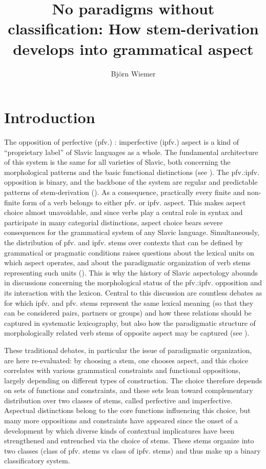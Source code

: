\documentclass[output=paper]{langscibook}
\author{Björn Wiemer\affiliation{Johannes Gutenberg Universität Mainz}}
\title[No paradigms without classification]{No paradigms without classification: How stem-derivation develops into grammatical aspect}
\begin{document}
\maketitle 

\section{Introduction}\label{wiemer:1}

The opposition of perfective (pfv.) : imperfective (ipfv.) aspect is a kind of “proprietary label” of Slavic languages as a whole. The fundamental architecture of this system is the same for all varieties of Slavic, both concerning the morphological patterns and the basic functional distinctions (see ). The pfv.:ipfv. opposition is binary, and the backbone of the system are regular and predictable patterns of stem-derivation (). As a consequence, practically every finite and non-finite form of a verb belongs to either pfv. or ipfv. aspect. This makes aspect choice almost unavoidable, and since verbs play a central role in syntax and participate in many categorial distinctions, aspect choice bears severe consequences for the grammatical system of any Slavic language. Simultaneously, the distribution of pfv. and ipfv. stems over contexts that can be defined by grammatical or pragmatic conditions raises questions about the lexical units on which aspect operates, and about the paradigmatic organization of verb stems representing such units (). This is why the history of Slavic aspectology abounds in discussions concerning the morphological status of the pfv.:ipfv. opposition and its interaction with the lexicon. Central to this discussion are countless debates as for which ipfv. and pfv. stems represent the same lexical meaning (so that they can be considered pairs, partners or groups) and how these relations should be captured in systematic lexicography, but also how the paradigmatic structure of morphologically related verb stems of opposite aspect may be captured (see ).

These traditional debates, in particular the issue of paradigmatic organization, are here re-evaluated: by choosing a stem, one chooses aspect, and this choice correlates with various grammatical constraints and functional oppositions, largely depending on different types of construction. The choice therefore depends on sets of functions and constraints, and these sets lean  toward complementary distribution over two classes of stems, called perfective and imperfective. Aspectual distinctions belong to the core functions influencing this choice, but many more oppositions and constraints have appeared since the onset of a development by which diverse kinds of contextual implicatures have been strengthened and entrenched via the choice of stems. These stems organize into two classes (class of pfv. stems vs class of ipfv. stems) and thus make up a binary classificatory system.
\end{document}
